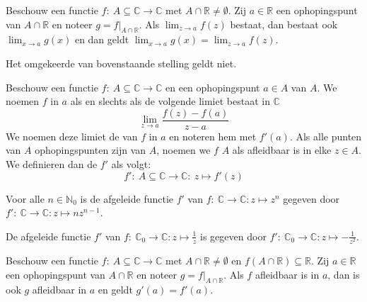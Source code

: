\documentclass[main.tex]{subfiles}
\begin{document}

\begin{bpr}
  Beschouw een functie $f:\ A \subseteq \mathbb{C} \rightarrow \mathbb{C}$ met $A \cap \mathbb{R} \neq \emptyset$.
  Zij $a \in \mathbb{R}$ een ophopingspunt van $A \cap \mathbb{R}$ en noteer $g=f|_{A \cap \mathbb{R}}$.
  Als $\lim_{z\rightarrow a}f(z)$ bestaat, dan bestaat ook $\lim_{x \rightarrow a}g(x)$ en dan geldt $\lim_{x \rightarrow a}g(x) = \lim_{z \rightarrow a}f(z)$.
\end{bpr}

\begin{tvb}
  Het omgekeerde van bovenstaande stelling geldt niet.

\end{tvb}

\begin{de}
  Beschouw een functie $f:\ A \subseteq \mathbb{C} \rightarrow \mathbb{C}$ en een ophopingspunt $a\in A$ van $A$.
  We noemen $f$  in $a$ als en slechts als de volgende limiet bestaat in $\mathbb{C}$
  \[ \lim_{z \rightarrow a}\frac{f(z)-f(a)}{z-a} \]
  We noemen deze limiet de  van $f$ in $a$ en noteren hem met $f'(a)$.
  Als alle punten van $A$ ophopingspunten zijn van $A$, noemen we $f$  $A$ als afleidbaar is in elke $z \in A$.
  We definieren dan de  $f'$ als volgt:
  \[ f':\ A \subseteq \mathbb{C} \rightarrow \mathbb{C}:\ z \mapsto f'(z) \]
\end{de}


\begin{vb}
  Voor alle $n \in \mathbb{N}_{0}$ is de afgeleide functie $f'$ van $f:\ \mathbb{C} \rightarrow \mathbb{C}: z \mapsto z^{n}$ gegeven door $f':\ \mathbb{C} \rightarrow \mathbb{C}: z \mapsto nz^{n-1}$.
\end{vb}

\begin{vb}
  De afgeleide functie $f'$ van $f:\ \mathbb{C}_{0} \rightarrow \mathbb{C}: z \mapsto \frac{1}{z}$ is gegeven door $f':\ \mathbb{C}_{0} \rightarrow \mathbb{C}: z \mapsto -\frac{1}{z^{2}}$.
\end{vb}

\begin{bpr}
  Beschouw een functie $f:\ A \subseteq \mathbb{C} \rightarrow \mathbb{C}$ met $A \cap \mathbb{R} \neq \emptyset$ en $f(A \cap \mathbb{R})\subseteq \mathbb{R}$.
  Zij $a \in \mathbb{R}$ een ophopingspunt van $A \cap \mathbb{R}$ en noteer $g=f|_{A \cap \mathbb{R}}$.
  Als $f$ afleidbaar is in $a$, dan is ook $g$ afleidbaar in $a$ en geldt $g'(a)=f'(a)$.
\end{bpr}
\end{document}
